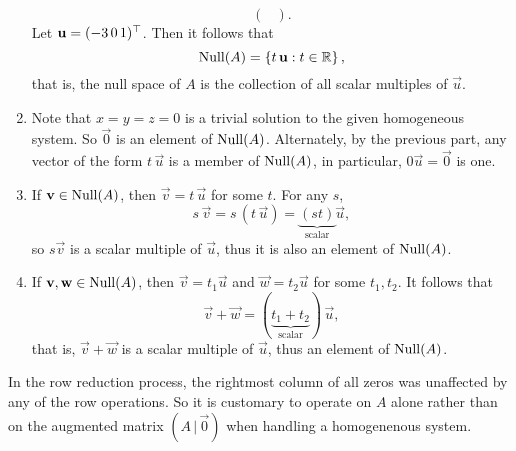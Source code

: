 \documentclass{ximera}
\begin{document}
\begin{example}
\begin{explanation}
\begin{enumerate}
\[\begin{pmatrix}
        \end{pmatrix}.
      \]
      Let $\mathbf{u} = (-3\, 0\, 1)^\top$. Then it follows that
      \[
        \operatorname{Null}(A) = \left\{ t\,\mathbf{u} : t \in \mathbb{R} \right\},
      \]
      that is, the null space of $A$ is the collection of all scalar
      multiples of $\vec{u}$.
    \item Note that $x = y = z = 0$ is a trivial solution to the given
      homogeneous system. So $\vec{0}$ is an element of
      $\operatorname{Null}(A)$. Alternately, by the previous part, any vector of the
      form $t\, \vec{u}$ is a member of $\operatorname{Null}(A)$, in particular, $0
      \vec{u} = \vec{0}$ is one.
    \item If $\mathbf{v} \in \operatorname{Null}(A)$, then $\vec{v} = t\, \vec{u}$ for some
      $t$. For any $s$,
      \[
        s\, \vec{v} = s\, (t\, \vec{u}) = \underbrace{(st)}_{\text{scalar}} \vec{u},
      \]
      so $s\vec{v}$ is a scalar multiple of $\vec{u}$, thus it is also
      an element of $\operatorname{Null}(A)$.
    \item If $\mathbf{v}, \mathbf{w} \in \operatorname{Null}(A)$, then $\vec{v} = t_1
      \vec{u}$ and $\vec{w} = t_2 \vec{u}$ for some $t_1, t_2$. It
      follows that
      \[
        \vec{v} + \vec{w} = (\underbrace{t_1 + t_2}_{\text{scalar}})\, \vec{u},
      \]
      that is, $\vec{v} + \vec{w}$ is a scalar multiple of $\vec{u}$,
      thus an element of $\operatorname{Null}(A)$.
    \end{enumerate}
  \end{explanation}
  \begin{remark}
    In the row reduction process, the rightmost column of all zeros
    was unaffected by any of the row operations. So it is customary to
    operate on $A$ alone rather than on the augmented matrix
    $(A \,|\, \vec{0})$ when handling a homogenenous system.
  \end{remark}
\end{example}
\end{document}

